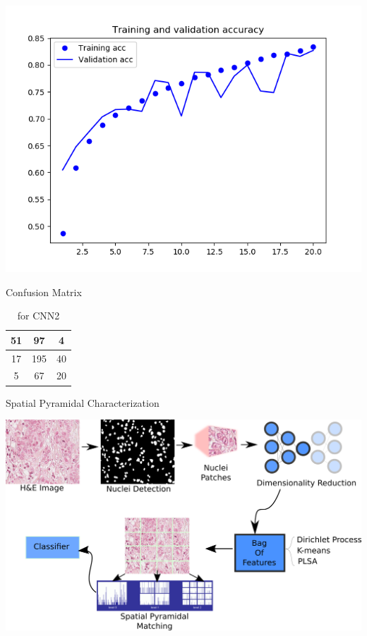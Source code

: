 \documentclass[usenames,dvipsnames]{beamer}
\begin{document}
\begin{frame}{}
\includegraphics[width=\textwidth]{imagenes/ResultACCepoch.png}
    
\end{frame}

\begin{frame}{Confusion Matrix}

\begin{table}[]
\begin{tabular}{|c|c|c|}
\hline
51 & 97  & 4  \\ \hline
17 & 195 & 40 \\ \hline
5  & 67  & 20 \\ \hline
\end{tabular}
\caption{for CNN2}
\end{table}
    
\end{frame}


\begin{frame}{Spatial Pyramidal Characterization }

\includegraphics[width=\textwidth]{imagenes_cnn/metodonuevo.png}
    
\end{frame}
\end{document}
